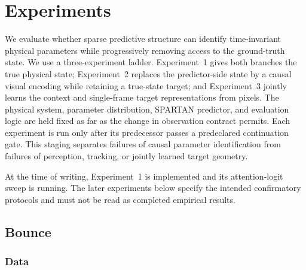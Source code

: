 
\section{Experiments}
\label{sec:experiments}

We evaluate whether sparse predictive structure can identify time-invariant physical
parameters while progressively removing access to the ground-truth state.  We use a
three-experiment ladder.  Experiment~1 gives both branches the true physical state;
Experiment~2 replaces the predictor-side state by a causal visual encoding while retaining a
true-state target; and Experiment~3 jointly learns the context and single-frame target
representations from pixels.  The physical system, parameter distribution, SPARTAN predictor,
and evaluation logic are held fixed as far as the change in observation contract permits.
Each experiment is run only after its predecessor passes a predeclared continuation gate.  This
staging separates failures of causal parameter identification from failures of perception,
tracking, or jointly learned target geometry.

At the time of writing, Experiment~1 is implemented and its attention-logit sweep is running.
The later experiments below specify the intended confirmatory protocols and must not be read as
completed empirical results.

\subsection{Bounce}
\label{sec:experiments:bounce}

\subsubsection{Data}
\label{sec:experiments:bounce:data}

